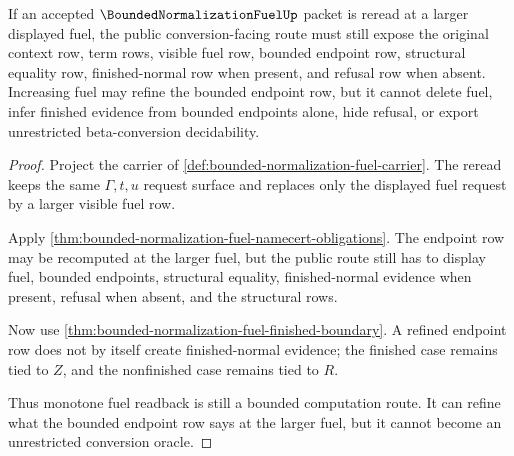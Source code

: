 \begin{theorem}
\label{thm:bounded-normalization-fuel-monotone-readback}
If an accepted $\BoundedNormalizationFuelUp$ packet is reread at a larger displayed fuel, the public conversion-facing route must still expose the original context row, term rows, visible fuel row, bounded endpoint row, structural equality row, finished-normal row when present, and refusal row when absent. Increasing fuel may refine the bounded endpoint row, but it cannot delete fuel, infer finished evidence from bounded endpoints alone, hide refusal, or export unrestricted beta-conversion decidability.
\end{theorem}
\begin{proof}
Project the carrier of \autoref{def:bounded-normalization-fuel-carrier}. The reread keeps the same $\Gamma,t,u$ request surface and replaces only the displayed fuel request by a larger visible fuel row.

Apply \autoref{thm:bounded-normalization-fuel-namecert-obligations}. The endpoint row may be recomputed at the larger fuel, but the public route still has to display fuel, bounded endpoints, structural equality, finished-normal evidence when present, refusal when absent, and the structural rows.

Now use \autoref{thm:bounded-normalization-fuel-finished-boundary}. A refined endpoint row does not by itself create finished-normal evidence; the finished case remains tied to $Z$, and the nonfinished case remains tied to $R$.

Thus monotone fuel readback is still a bounded computation route. It can refine what the bounded endpoint row says at the larger fuel, but it cannot become an unrestricted conversion oracle.
\end{proof}




